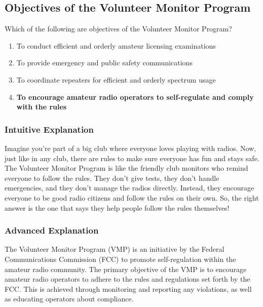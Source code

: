 \subsection{Objectives of the Volunteer Monitor Program}
\label{G2D02}

\begin{tcolorbox}[colback=gray!10!white,colframe=black!75!black,title=G2D02]
Which of the following are objectives of the Volunteer Monitor Program?
\begin{enumerate}[label=\Alph*),noitemsep]
    \item To conduct efficient and orderly amateur licensing examinations
    \item To provide emergency and public safety communications
    \item To coordinate repeaters for efficient and orderly spectrum usage
    \item \textbf{To encourage amateur radio operators to self-regulate and comply with the rules}
\end{enumerate}
\end{tcolorbox}

\subsubsection{Intuitive Explanation}
Imagine you're part of a big club where everyone loves playing with radios. Now, just like in any club, there are rules to make sure everyone has fun and stays safe. The Volunteer Monitor Program is like the friendly club monitors who remind everyone to follow the rules. They don't give tests, they don't handle emergencies, and they don't manage the radios directly. Instead, they encourage everyone to be good radio citizens and follow the rules on their own. So, the right answer is the one that says they help people follow the rules themselves!

\subsubsection{Advanced Explanation}
The Volunteer Monitor Program (VMP) is an initiative by the Federal Communications Commission (FCC) to promote self-regulation within the amateur radio community. The primary objective of the VMP is to encourage amateur radio operators to adhere to the rules and regulations set forth by the FCC. This is achieved through monitoring and reporting any violations, as well as educating operators about compliance.

